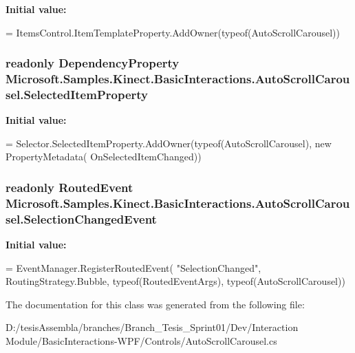 {\bfseries Initial value\-:}
\begin{DoxyCode}
=
            ItemsControl.ItemTemplateProperty.AddOwner(typeof(AutoScrollCarousel))
\end{DoxyCode}
\hypertarget{class_microsoft_1_1_samples_1_1_kinect_1_1_basic_interactions_1_1_auto_scroll_carousel_a99f46b9f3173b6d522b4d401d3139306}{
\subsubsection[{Selected\-Item\-Property}]{\setlength{\rightskip}{0pt plus 5cm}readonly Dependency\-Property Microsoft.\-Samples.\-Kinect.\-Basic\-Interactions.\-Auto\-Scroll\-Carousel.\-Selected\-Item\-Property\hspace{0.3cm}{\ttfamily [static]}}}\label{class_microsoft_1_1_samples_1_1_kinect_1_1_basic_interactions_1_1_auto_scroll_carousel_a99f46b9f3173b6d522b4d401d3139306}
{\bfseries Initial value\-:}
\begin{DoxyCode}
=
            Selector.SelectedItemProperty.AddOwner(typeof(AutoScrollCarousel), \textcolor{keyword}{new} PropertyMetadata(
      OnSelectedItemChanged))
\end{DoxyCode}
\hypertarget{class_microsoft_1_1_samples_1_1_kinect_1_1_basic_interactions_1_1_auto_scroll_carousel_aaa9605439ebe959f2689aec9e1c36c78}{
\subsubsection[{Selection\-Changed\-Event}]{\setlength{\rightskip}{0pt plus 5cm}readonly Routed\-Event Microsoft.\-Samples.\-Kinect.\-Basic\-Interactions.\-Auto\-Scroll\-Carousel.\-Selection\-Changed\-Event\hspace{0.3cm}{\ttfamily [static]}}}\label{class_microsoft_1_1_samples_1_1_kinect_1_1_basic_interactions_1_1_auto_scroll_carousel_aaa9605439ebe959f2689aec9e1c36c78}
{\bfseries Initial value\-:}
\begin{DoxyCode}
= EventManager.RegisterRoutedEvent(
            \textcolor{stringliteral}{"SelectionChanged"},
            RoutingStrategy.Bubble,
            typeof(RoutedEventArgs),
            typeof(AutoScrollCarousel))
\end{DoxyCode}


The documentation for this class was generated from the following file\-:\begin{DoxyCompactItemize}
\item 
D\-:/tesis\-Assembla/branches/\-Branch\-\_\-\-Tesis\-\_\-\-Sprint01/\-Dev/\-Interaction Module/\-Basic\-Interactions-\/\-W\-P\-F/\-Controls/Auto\-Scroll\-Carousel.\-cs\end{DoxyCompactItemize}
